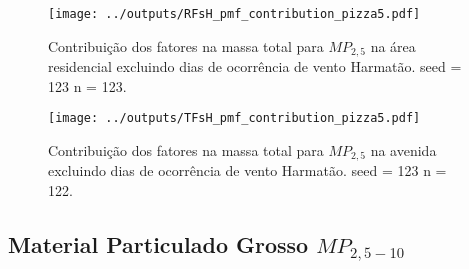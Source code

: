 \begin{landscape}
  \begin{figure}
    \centering
    \begin{minipage}[b]{0.45\linewidth}
      \texttt{[image: ../outputs/RFsH\_pmf\_contribution\_pizza5.pdf]}
      \caption{Contribuição dos fatores na massa total para $MP_{2,5}$ na área
               residencial excluindo dias de ocorrência de vento Harmatão. seed = 123 n = 123.
               \label{fig:RFsH_contribution5}}
    \end{minipage}%
    \hspace{0.5cm}
    \begin{minipage}[b]{0.45\linewidth}
      
    \end{minipage}
  \end{figure}
\end{landscape}

\begin{landscape}
  \begin{figure}
    \centering
    \begin{minipage}[b]{0.45\linewidth}
      \texttt{[image: ../outputs/TFsH\_pmf\_contribution\_pizza5.pdf]}
      \caption{Contribuição dos fatores na massa total para $MP_{2,5}$ na avenida
               excluindo dias de ocorrência de vento Harmatão. seed = 123 n = 122.
               \label{fig:TFsH_contribution5}}
    \end{minipage}%
    \hspace{0.5cm}
    \begin{minipage}[b]{0.45\linewidth}
      
    \end{minipage}
  \end{figure}
\end{landscape}


\subsection{Material Particulado Grosso $MP_{2,5-10}$}


